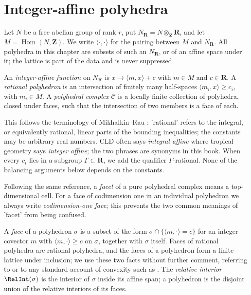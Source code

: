 \section{Integer-affine polyhedra}
\label{sec:ch10-polyhedra}

Let $N$ be a free abelian group of rank $r$, put
$N_{\mathbf R}=N\otimes_{\mathbf Z}\mathbf R$, and let
$M=\operatorname{Hom}(N,\mathbf Z)$.  We write
$\langle\cdot,\cdot\rangle$ for the pairing between $M$ and $N_{\mathbf R}$.
All polyhedra in this chapter are subsets of such an $N_{\mathbf R}$, or of
an affine space under it; the lattice is part of the data and is never
suppressed.

\begin{definition}
\label{def:ch10-integer-affine-polyhedra}
An \emph{integer-affine function} on $N_{\mathbf R}$ is $x\mapsto
\langle m,x\rangle+c$ with $m\in M$ and $c\in\mathbf R$. A
\emph{rational polyhedron} is an intersection of finitely many half-spaces
$\langle m_i,x\rangle\geq c_i$, with $m_i\in M$. A \emph{polyhedral complex}
$\mathscr C$ is a locally finite collection of polyhedra, closed under faces,
such that the intersection of two members is a face of each.
\end{definition}

This follows the terminology of Mikhalkin--Rau
\cite[\S\S1.3 and 2.1]{MR18Tropical}: 'rational' refers to the integral, or
equivalently rational, linear parts of the bounding inequalities; the
constants may be arbitrary real numbers.  CLD often says \emph{integral
affine} where tropical geometry says \emph{integer affine}; the two phrases
are synonyms in this book.  When every $c_i$ lies in a subgroup
$\Gamma\subset\mathbf R$, we add the qualifier $\Gamma$-rational.  None of
the balancing arguments below depends on the constants.

Following the same reference, a \emph{facet} of a pure polyhedral complex
means a top-dimensional cell.  For a face of codimension one in an individual
polyhedron we always write \emph{codimension-one face}; this prevents the two
common meanings of 'facet' from being confused.

A \emph{face} of a polyhedron $\sigma$ is a subset of the form
$\sigma\cap\{\langle m,\cdot\rangle=c\}$ for an integer covector $m$ with
$\langle m,\cdot\rangle\geq c$ on $\sigma$, together with $\sigma$ itself.
Faces of rational polyhedra are rational polyhedra, and the faces of a
polyhedron form a finite lattice under inclusion; we use these two facts
without further comment, referring to \cite[\S1.3]{MR18Tropical} or to any
standard account of convexity such as \cite{Roc70,Sch14}.  The
\emph{relative interior} $\RelInt(\sigma)$ is the interior of $\sigma$ inside
its affine span; a polyhedron is the disjoint union of the relative interiors
of its faces.

